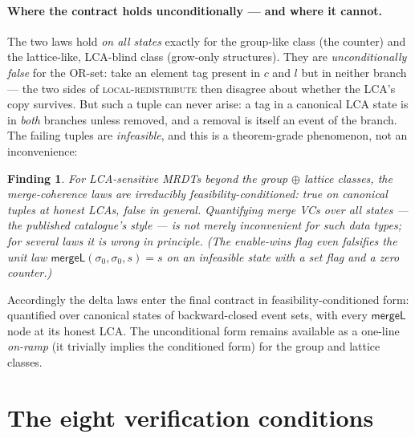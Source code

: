 \documentclass[11pt]{article}
\newtheorem*{finding}{Finding}
\newcommand{\mergeL}{\mathsf{mergeL}}
\newcommand{\Sinit}{\sigma_0}
\begin{document}
\paragraph{Where the contract holds unconditionally --- and where it
cannot.} The two laws hold \emph{on all states} exactly for the
group-like class (the counter) and the lattice-like, LCA-blind class
(grow-only structures). They are \emph{unconditionally false} for the
OR-set: take an element tag present in $c$ and $l$ but in neither branch
--- the two sides of \textsc{local-redistribute} then disagree about
whether the LCA's copy survives. But such a tuple can never arise: a tag
in a canonical LCA state is in \emph{both} branches unless removed, and a
removal is itself an event of the branch. The failing tuples are
\emph{infeasible}, and this is a theorem-grade phenomenon, not an
inconvenience:

\begin{finding}
For LCA-sensitive MRDTs beyond the group $\oplus$ lattice classes, the
merge-coherence laws are irreducibly \emph{feasibility-conditioned}: true
on canonical tuples at honest LCAs, false in general. Quantifying merge
VCs over all states --- the published catalogue's style --- is not merely
inconvenient for such data types; for several laws it is wrong in
principle. (The enable-wins flag even falsifies the \emph{unit} law
$\mergeL(\Sinit,\Sinit,s)=s$ on an infeasible state with a set flag and a
zero counter.)
\end{finding}

Accordingly the delta laws enter the final contract in
feasibility-conditioned form: quantified over canonical states of
backward-closed event sets, with every $\mergeL$ node at its honest LCA.
The unconditional form remains available as a one-line \emph{on-ramp} (it
trivially implies the conditioned form) for the group and lattice
classes.

\section{The eight verification conditions}
\label{sec:vcs}
\end{document}
